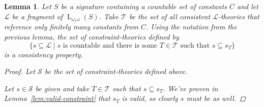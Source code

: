 \documentclass{amsart}
\newtheorem{lemma}[theorem]{Lemma}
\theoremstyle{definition}
\numberwithin{equation}{theorem}
\newcommand{\where}{\mid}
\newcommand{\baselang}{\operatorname{L}}
\newcommand{\lang}{\baselang_{\omega_1\omega}}
\newcommand{\frag}{\mathcal{L}}
\begin{document}
\begin{lemma}\label{lem:proof-theoretic-consistency-property}
  Let $S$ be a signature containing a countable set of constants $C$ and let $\frag$ be a fragment of $\lang(S)$.
  Take $\mathcal T$ be the set of all consistent $\frag$-theories that reference only finitely many constants from $C$.
  Using the notation from the previous lemma, the set of constraint-theories defined by
  \[
    \{s\subseteq\frag\where\text{$s$ is countable and there is some $T\in\mathcal T$ such that $s\subseteq s_T$}\}
  \]
  is a consistency property.
  \begin{proof}
    Let $\mathscr{S}$ be the set of constraint-theories defined above.
    
    Let $s\in \mathscr{S}$ be given and take $T\in\mathcal T$ such that $s\subseteq s_T$.
    We've proven in Lemma~\ref{lem:valid-constraint} that $s_T$ is valid, so clearly $s$ must be as well.
    

\end{proof}
\end{lemma}
\end{document}
